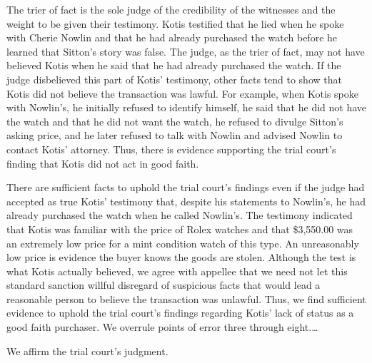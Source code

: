 The trier of fact is the sole judge of the credibility of the witnesses and the
weight to be given their testimony. Kotis testified that he lied when he spoke
with Cherie Nowlin and that he had already purchased the watch before he
learned that Sitton's story was false. The judge, as the trier of fact, may not
have believed Kotis when he said that he had already purchased the watch. If
the judge disbelieved this part of Kotis' testimony, other facts tend to show
that Kotis did not believe the transaction was lawful. For example, when Kotis
spoke with Nowlin's, he initially refused to identify himself, he said that he
did not have the watch and that he did not want the watch, he refused to
divulge Sitton's asking price, and he later refused to talk with Nowlin and
advised Nowlin to contact Kotis' attorney. Thus, there is evidence supporting
the trial court's finding that Kotis did not act in good faith.

There are sufficient facts to uphold the trial court's findings even if the
judge had accepted as true Kotis' testimony that, despite his statements to
Nowlin's, he had already purchased the watch when he called Nowlin's. The
testimony indicated that Kotis was familiar with the price of Rolex watches and
that \$3,550.00 was an extremely low price for a mint condition watch of this
type. An unreasonably low price is evidence the buyer knows the goods are
stolen. Although the test is what Kotis actually believed, we agree with
appellee that we need not let this standard sanction willful disregard of
suspicious facts that would lead a reasonable person to believe the transaction
was unlawful. Thus, we find sufficient evidence to uphold the trial court's
findings regarding Kotis' lack of status as a good faith purchaser. We overrule
points of error three through eight.\ldots

We affirm the trial court's judgment.

